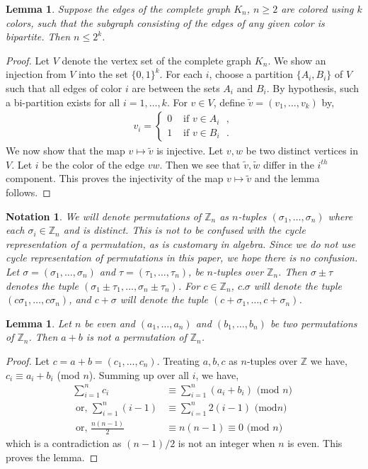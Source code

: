 \documentclass[12pt]{article}
\newcommand{\mb}{\mathbb}
\newtheorem{lemma}[defn]{{\bf Lemma}}
\newtheorem{notation}[defn]{{\bf Notation}}
\begin{document}
\begin{lemma}\label{lem:ramsey}
Suppose the edges of the complete graph $K_n$, $n\geq 2$ are colored using
$k$ colors, such that the subgraph consisting of the edges of any given color is
bipartite. Then $n\leq 2^k$.
\end{lemma}
\begin{proof}
Let $V$ denote the vertex set of the complete graph $K_n$. We show an
injection from $V$ into the set $\{0,1\}^k$. For
each $i$, choose a partition $\{A_i,B_i\}$ of $V$ such that all edges of
color $i$ are between the sets $A_i$ and $B_i$. By hypothesis, such a
bi-partition exists for all $i=1,\ldots,k$. For $v\in V$, define
$\tilde{v}=(v_1,\ldots,v_k)$ by,
\begin{align*}
v_i = \begin{cases}
		0 & \text{ if $v\in A_i$ }, \\
		1 & \text{ if $v\in B_i$ }.
\end{cases}
\end{align*}
We now show that the map $v\mapsto \tilde{v}$ is injective. Let $v,w$ be
two distinct vertices in $V$. Let $i$ be the color of the edge $vw$. Then
we see that $\tilde{v},\tilde{w}$ differ in the $i^{th}$ component. This
proves the injectivity of the map $v\mapsto \tilde{v}$ and the lemma
follows.  
\end{proof}

\begin{notation}{\rm
We will denote permutations of $\mb{Z}_n$ as $n$-tuples
$(\sigma_1,\ldots,\sigma_n)$ where
each $\sigma_i\in \mb{Z}_n$ and is distinct. This is not to be confused with
 the cycle representation of a permutation, as is customary in algebra. Since we
do not use cycle representation of permutations in this paper, we hope
there is no confusion. Let $\sigma=(\sigma_1,\ldots,\sigma_n)$
and $\tau=(\tau_1,\ldots,\tau_n)$, be $n$-tuples over $\mb{Z}_n$. Then $\sigma\pm \tau$ denotes the tuple
$(\sigma_1\pm \tau_1,\ldots,\sigma_n\pm \tau_n)$. For $c\in \mb{Z}_n$,
$c.\sigma$ will denote the tuple $(c\sigma_1,\ldots,c\sigma_n)$, and
$c+\sigma$ will denote the tuple $(c+\sigma_1,\ldots,c+\sigma_n)$.  
}
\end{notation}

\begin{lemma}\label{lem:evencase}
Let $n$ be even and $(a_1,\ldots,a_n)$ and $(b_1,\ldots,b_n)$ be two
permutations of $\mb{Z}_n$. Then $a+b$ is not a permutation of $\mb{Z}_n$.
\end{lemma}
\begin{proof}
Let $c=a+b=(c_1,\ldots,c_n)$. Treating $a,b,c$ as $n$-tuples over $\mb{Z}$
we have,  $c_i \equiv a_i+b_i$ (mod $n$). Summing up over all $i$, we have,
\begin{align*}
\sum_{i=1}^n c_i &\equiv \sum_{i=1}^n (a_i+b_i) \text{ (mod $n$) } \\
\text{ or, } \sum_{i=1}^n (i-1) &\equiv \sum_{i=1}^n 2(i-1) \text{ (mod
$n$) } \\
\text{ or, } \frac{n(n-1)}{2} &\equiv n(n-1) \equiv 0 \text{ (mod $n$) }
\end{align*}
which is a contradiction as $(n-1)/2$ is not an integer when $n$ is even.
This proves the lemma.
\end{proof}
\end{document}
